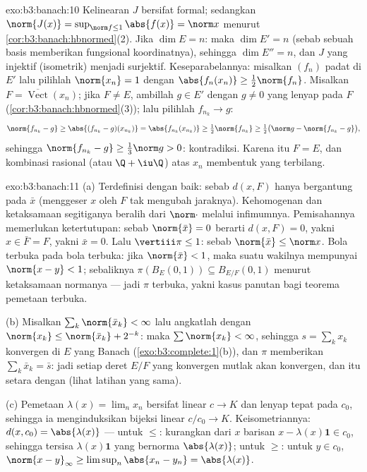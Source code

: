 \begin{solution}{exo:b3:banach:10}
Kelinearan $J$ bersifat formal; sedangkan $\norm{J(x)} = \sup_{\norm f \leq
1}\abs{f(x)} = \norm x$ menurut
\cref{cor:b3:banach:hbnormed}(2). Jika $\dim E = n$: maka $\dim E' =
n$ (sebab sebuah basis memberikan fungsional koordinatnya), sehingga $\dim E'' = n$,
dan $J$ yang injektif (isometrik) menjadi surjektif. Keseparabelannya: misalkan
$(f_n)$ padat di $E'$ lalu pilihlah $\norm{x_n} = 1$ dengan
$\abs{f_n(x_n)} \geq \frac12\norm{f_n}$. Misalkan $F =
\overline{\operatorname{Vect}}(x_n)$; jika $F \neq E$, ambillah $g
\in E'$ dengan $g \neq 0$ yang lenyap pada $F$
(\cref{cor:b3:banach:hbnormed}(3)); lalu pilihlah $f_{n_k} \to g$:
\[
\norm{f_{n_k} - g} \geq \abs{(f_{n_k} - g)(x_{n_k})}
= \abs{f_{n_k}(x_{n_k})} \geq \tfrac12\norm{f_{n_k}}
\geq \tfrac12\bigl(\norm g - \norm{f_{n_k} - g}\bigr),
\]
sehingga $\norm{f_{n_k} - g} \geq \frac13\norm g > 0$: kontradiksi.
Karena itu $F = E$, dan kombinasi rasional (atau $\Q + \iu\Q$) atas
$x_n$ membentuk  yang terbilang.
\end{solution}

\begin{solution}{exo:b3:banach:11}
(a) Terdefinisi dengan baik: sebab $d(x, F)$ hanya bergantung pada $\bar x$
(menggeser $x$ oleh $F$ tak mengubah jaraknya).
Kehomogenan dan ketaksamaan segitiganya beralih dari $\norm\cdot$
melalui infimumnya. Pemisahannya memerlukan ketertutupan: sebab $\norm{\bar
x} = 0$ berarti $d(x, F) = 0$, yakni $x \in \bar F = F$, yakni
$\bar x = 0$. Lalu $\vertiii\pi \leq 1$: sebab $\norm{\bar x} \leq
\norm x$. Bola terbuka pada bola terbuka: jika $\norm{\bar x} < 1$,
maka suatu wakilnya mempunyai $\norm{x - y} < 1$; sebaliknya
$\pi(B_E(0,1)) \subseteq B_{E/F}(0,1)$ menurut ketaksamaan
normanya --- jadi $\pi$ terbuka, yakni kasus panutan bagi teorema
pemetaan terbuka.

(b) Misalkan $\sum_k\norm{\bar x_k} < \infty$ lalu angkatlah dengan
$\norm{x_k} \leq \norm{\bar x_k} + 2^{-k}$: maka
$\sum\norm{x_k} < \infty$, sehingga $s = \sum_kx_k$ konvergen di
$E$ yang Banach (\cref{exo:b3:complete:1}(b)), dan 
$\pi$ memberikan $\sum_k\bar x_k = \bar s$: jadi setiap deret $E/F$ yang
konvergen mutlak akan konvergen, dan itu setara dengan
 (lihat latihan yang sama).

(c) Pemetaan $\lambda(x) = \lim_nx_n$ bersifat linear $c \to K$ dan
lenyap tepat pada $c_0$, sehingga ia menginduksikan bijeksi linear
$c/c_0 \to K$. Keisometriannya: $d(x, c_0) = \abs{\lambda(x)}$ ---
untuk $\leq$: kurangkan dari $x$ barisan $x - \lambda(x)\mathbf
1 \in c_0$, sehingga tersisa $\lambda(x)\mathbf 1$ yang bernorma
$\abs{\lambda(x)}$; untuk $\geq$: untuk $y \in c_0$, $\norm{x -
y}_\infty \geq \limsup_n\abs{x_n - y_n} = \abs{\lambda(x)}$.
\end{solution}

